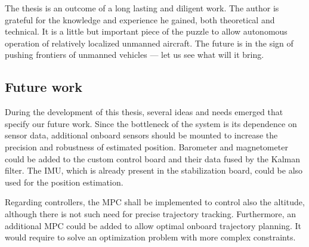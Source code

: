 The thesis is an outcome of a long lasting and diligent work. The author is grateful for the knowledge and experience he gained, both theoretical and technical. It is a little but important piece of the puzzle to allow autonomous operation of relatively localized unmanned aircraft. The future is in the sign of pushing frontiers of unmanned vehicles --- let us see what will it bring.

\subsection{Future work}

During the development of this thesis, several ideas and needs emerged that specify our future work. Since the bottleneck of the system is its dependence on sensor data, additional onboard sensors should be mounted to increase the precision and robustness of estimated position. Barometer and magnetometer could be added to the custom control board and their data fused by the Kalman filter. The IMU, which is already present in the stabilization board, could be also used for the position estimation.

Regarding controllers, the MPC shall be implemented to control also the altitude, although there is not such need for precise trajectory tracking. Furthermore, an additional MPC could be added to allow optimal onboard trajectory planning. It would require to solve an optimization problem with more complex constraints. 
